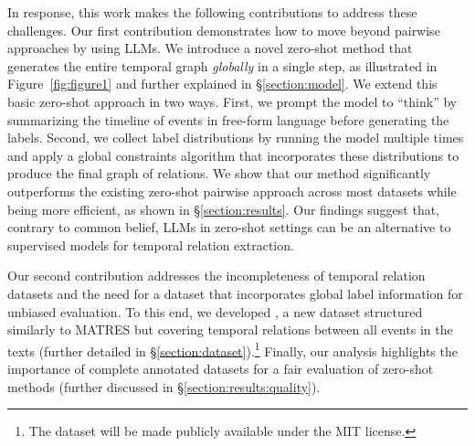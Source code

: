 In response, this work makes the following contributions to address these challenges.
Our first contribution demonstrates how to move beyond pairwise approaches by using LLMs. We introduce a novel zero-shot method that generates the entire temporal graph \textit{globally} in a single step, as illustrated in Figure~\ref{fig:figure1} and further explained in §\ref{section:model}. 
We extend this basic zero-shot approach in two ways. First, we prompt the model to ``think'' by summarizing the timeline of events in free-form language before generating the labels. Second, we collect label distributions by running the model multiple times and apply a global constraints algorithm that incorporates these distributions to produce the final graph of relations.
We show that our method significantly outperforms the existing zero-shot pairwise approach across most datasets while being more efficient, as shown in §\ref{section:results}. Our findings suggest that, contrary to common belief, LLMs in zero-shot settings can be an alternative to supervised models for temporal relation extraction.


Our second contribution addresses the incompleteness of temporal relation datasets and the need for a dataset that incorporates global label information for unbiased evaluation. To this end, we developed \textit{\App{}}, a new dataset structured similarly to MATRES \cite{ning-etal-2018-multi} but covering temporal relations between all events in the texts (further detailed in §\ref{section:dataset}).\footnote{The \App{} dataset will be made publicly available under the MIT license.} Finally, our analysis highlights the importance of complete annotated datasets for a fair evaluation of zero-shot methods (further discussed in §\ref{section:results:quality}).
